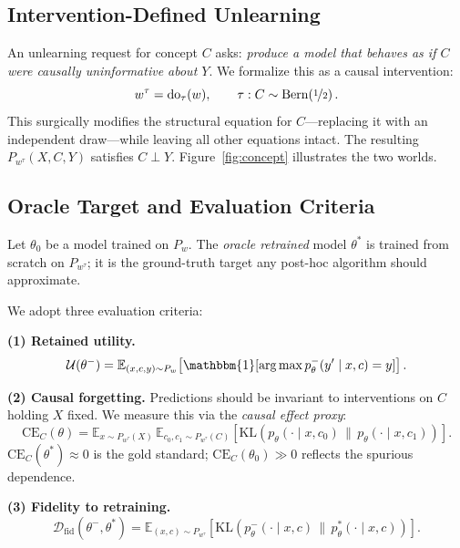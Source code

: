 \documentclass{article}
\newcommand{\doop}{\mathrm{do}}
\newcommand{\CE}{\mathrm{CE}}
\newcommand{\Dfid}{\mathcal{D}_{\mathrm{fid}}}
\newcommand{\Pw}{P_w}
\newcommand{\Pwt}{P_{w^\tau}}
\newcommand{\ptheta}{p_{\theta}}
\newcommand{\EE}{\mathbb{E}}
\begin{document}
\subsection{Intervention-Defined Unlearning}

An unlearning request for concept $C$ asks: \emph{produce a model that behaves
as if $C$ were causally uninformative about $Y$}.  We formalize this as a
causal intervention:
\begin{equation}
  w^\tau = \doop_\tau(w), \qquad \tau: C \sim \mathrm{Bern}\!\left(\nicefrac{1}{2}\right).
  \label{eq:intervention}
\end{equation}
This surgically modifies the structural equation for $C$—replacing it with an
independent draw—while leaving all other equations intact.  The resulting
$\Pwt(X, C, Y)$ satisfies $C \perp Y$.  Figure~\ref{fig:concept} illustrates the
two worlds.

\subsection{Oracle Target and Evaluation Criteria}

Let $\theta_0$ be a model trained on $\Pw$.  The
\emph{oracle retrained} model $\theta^*$ is trained from scratch on $\Pwt$;
it is the ground-truth target any post-hoc algorithm should approximate.

We adopt three evaluation criteria:

\textbf{(1) Retained utility.}
\begin{equation}
  \mathcal{U}(\theta^-) = \EE_{(x,c,y) \sim \Pw}\!\left[\mathbbm{1}[\arg\max \ptheta^-(y' \mid x, c) = y]\right].
\end{equation}

\textbf{(2) Causal forgetting.}  Predictions should be invariant to
interventions on $C$ holding $X$ fixed.  We measure this via the
\emph{causal effect proxy}:
\begin{equation}
  \CE_C(\theta) = \EE_{x \sim \Pwt(X)}\,\EE_{c_0, c_1 \sim \Pwt(C)}
  \!\left[\mathrm{KL}\!\left(\ptheta(\cdot \mid x, c_0)\,\big\|\,\ptheta(\cdot \mid x, c_1)\right)\right].
  \label{eq:ce}
\end{equation}
$\CE_C(\theta^*) \approx 0$ is the gold standard; $\CE_C(\theta_0) \gg 0$
reflects the spurious dependence.

\textbf{(3) Fidelity to retraining.}
\begin{equation}
  \Dfid(\theta^-, \theta^*) = \EE_{(x,c) \sim \Pwt}\!\left[
    \mathrm{KL}\!\left(\ptheta^-(\cdot \mid x, c)\,\big\|\,\ptheta^*(\cdot \mid x, c)\right)
  \right].
  \label{eq:fidelity}
\end{equation}
\end{document}
